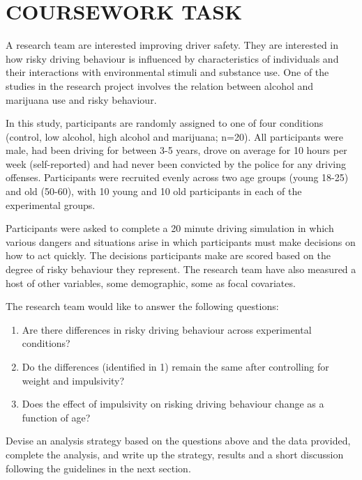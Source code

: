 \documentclass[
]{article}
\providecommand{\tightlist}{%
  \setlength{\itemsep}{0pt}\setlength{\parskip}{0pt}}
\begin{document}
\pagebreak

\hypertarget{coursework-task}{%
\section{COURSEWORK TASK}\label{coursework-task}}

A research team are interested improving driver safety. They are
interested in how risky driving behaviour is influenced by
characteristics of individuals and their interactions with environmental
stimuli and substance use. One of the studies in the research project
involves the relation between alcohol and marijuana use and risky
behaviour.

In this study, participants are randomly assigned to one of four
conditions (control, low alcohol, high alcohol and marijuana; n=20). All
participants were male, had been driving for between 3-5 years, drove on
average for 10 hours per week (self-reported) and had never been
convicted by the police for any driving offenses. Participants were
recruited evenly across two age groups (young 18-25) and old (50-60),
with 10 young and 10 old participants in each of the experimental
groups.

Participants were asked to complete a 20 minute driving simulation in
which various dangers and situations arise in which participants must
make decisions on how to act quickly. The decisions participants make
are scored based on the degree of risky behaviour they represent. The
research team have also measured a host of other variables, some
demographic, some as focal covariates.

The research team would like to answer the following questions:

\begin{enumerate}
\def\labelenumi{\arabic{enumi}.}
\tightlist
\item
  Are there differences in risky driving behaviour across experimental
  conditions?
\item
  Do the differences (identified in 1) remain the same after controlling
  for weight and impulsivity?
\item
  Does the effect of impulsivity on risking driving behaviour change as
  a function of age?
\end{enumerate}

Devise an analysis strategy based on the questions above and the data
provided, complete the analysis, and write up the strategy, results and
a short discussion following the guidelines in the next section.
\end{document}

